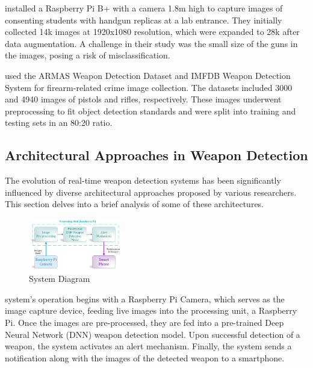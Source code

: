 \citet{rfc19} installed a Raspberry Pi B+ with a camera 1.8m high to capture images of consenting students with handgun replicas at a lab entrance. They initially collected 14k images at 1920x1080 resolution, which were expanded to 28k after data augmentation. A challenge in their study was the small size of the guns in the images, posing a risk of misclassification.

\citet{rfc20} used the ARMAS Weapon Detection Dataset and IMFDB Weapon Detection System \cite{rfc28} for firearm-related crime image collection. The datasets included 3000 and 4940 images of pistols and rifles, respectively. These images underwent preprocessing to fit object detection standards and were split into training and testing sets in an 80:20 ratio.

\subsection{Architectural Approaches in Weapon Detection}
The evolution of real-time weapon detection systems has been significantly influenced by diverse architectural approaches proposed by various researchers. This section delves into a brief analysis of some of these architectures.

\begin{figure}[h]
    \centering 
    \includegraphics[width=0.36\textwidth]{figs/uob-architecture.png} 
    \caption{\citet{rfc44} System Diagram}
    \label{fig:uob-architecture}
\end{figure}

\citet{rfc44} system's operation begins with a Raspberry Pi Camera, which serves as the image capture device, feeding live images into the processing unit, a Raspberry Pi. Once the images are pre-processed, they are fed into a pre-trained Deep Neural Network (DNN) weapon detection model. Upon successful detection of a weapon, the system activates an alert mechanism. Finally, the system sends a notification along with the images of the detected weapon to a smartphone.

